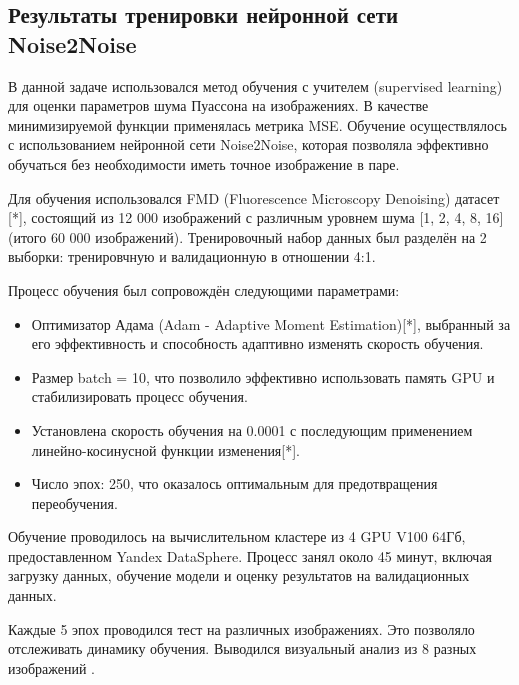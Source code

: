 \subsection{Результаты тренировки нейронной сети Noise2Noise}
\par В данной задаче использовался метод обучения с учителем (supervised learning) для оценки параметров шума Пуассона на изображениях. В качестве минимизируемой функции применялась метрика MSE. Обучение осуществлялось с использованием нейронной сети Noise2Noise, которая позволяла эффективно обучаться без необходимости иметь точное изображение в паре. 
\par Для обучения использовался FMD (Fluorescence Microscopy
Denoising) датасет [*], состоящий из 12 000 изображений с различным уровнем шума [1, 2, 4, 8, 16] (итого 60 000 изображений). Тренировочный набор данных был разделён на 2 выборки: тренировчную и валидационную в отношении 4:1.
\par Процесс обучения был сопровождён следующими параметрами:
\begin{itemize}[]
	\item Оптимизатор Адама (Adam - Adaptive Moment Estimation)[*], выбранный за его эффективность и способность адаптивно изменять скорость обучения.
	\item Размер batch = 10, что позволило эффективно использовать память GPU и стабилизировать процесс обучения.
	\item Установлена скорость обучения на 0.0001 с последующим применением линейно-косинусной функции изменения[*].
	\item Число эпох: 250, что оказалось оптимальным для предотвращения переобучения.
\end{itemize}
\par Обучение проводилось на вычислительном кластере из 4 GPU V100 64Гб, предоставленном Yandex DataSphere. Процесс занял около 45 минут, включая загрузку данных, обучение модели и оценку результатов на валидационных данных. 

\par Каждые 5 эпох проводился тест на различных изображениях. Это позволяло отслеживать динамику обучения. Выводился визуальный анализ из 8 разных изображений .

